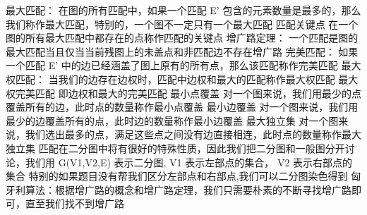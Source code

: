 {}最大匹配：\markdownRendererParagraphSeparator
{}在图的所有匹配中，如果一个匹配\markdownRendererDollarSign{} E\markdownRendererCircumflex{}\markdownRendererLeftBrace{}'\markdownRendererRightBrace{} \markdownRendererDollarSign{}包含的元素数量是最多的，那么我们称作最大匹配，特别的，一个图不一定只有一个最大匹配\markdownRendererParagraphSeparator
{}匹配关键点\markdownRendererParagraphSeparator
{}在一个图的所有最大匹配中都存在的点称作匹配的关键点\markdownRendererParagraphSeparator
{}增广路定理：\markdownRendererParagraphSeparator
{}一个匹配是图的最大匹配当且仅当当前残图上的未盖点和非匹配边不存在增广路\markdownRendererParagraphSeparator
{}完美匹配：\markdownRendererParagraphSeparator
{}如果一个匹配\markdownRendererDollarSign{} E\markdownRendererCircumflex{}\markdownRendererLeftBrace{}'\markdownRendererRightBrace{} \markdownRendererDollarSign{}中的边已经涵盖了图上原有的所有点，那么该匹配称作完美匹配\markdownRendererParagraphSeparator
{}最大权匹配：\markdownRendererParagraphSeparator
{}当我们的边存在边权时，匹配中边权和最大的匹配称作最大权匹配\markdownRendererParagraphSeparator
{}最大权完美匹配\markdownRendererParagraphSeparator
{}即边权和最大的完美匹配\markdownRendererParagraphSeparator
{}最小点覆盖\markdownRendererParagraphSeparator
{}对一个图来说，我们用最少的点覆盖所有的边，此时点的数量称作最小点覆盖\markdownRendererParagraphSeparator
{}最小边覆盖\markdownRendererParagraphSeparator
{}对一个图来说，我们用最少的边覆盖所有的点，此时边的数量称作最小边覆盖\markdownRendererParagraphSeparator
{}最大独立集\markdownRendererParagraphSeparator
{}对一个图来说，我们选出最多的点，满足这些点之间没有边直接相连，此时点的数量称作最大独立集\markdownRendererInterblockSeparator
{}
\markdownRendererSectionEnd \markdownRendererSectionBegin
{}\markdownRendererInterblockSeparator
{}匹配在二分图中将有很好的特殊性质，因此我们把二分图和一般图分开讨论，我们用\markdownRendererDollarSign{} G(V1,V2,E) \markdownRendererDollarSign{}表示二分图,\markdownRendererDollarSign{} V1 \markdownRendererDollarSign{}表示左部点的集合，\markdownRendererDollarSign{} V2 \markdownRendererDollarSign{}表示右部点的集合\markdownRendererParagraphSeparator
{}特别的如果题目没有帮我们区分左部点和右部点,我们可以二分图染色得到\markdownRendererInterblockSeparator
{}\markdownRendererSectionBegin
{}\markdownRendererInterblockSeparator
{}匈牙利算法：根据增广路的概念和增广路定理，我们只需要朴素的不断寻找增广路即可，直至我们找不到增广路\markdownRendererParagraphSeparator
